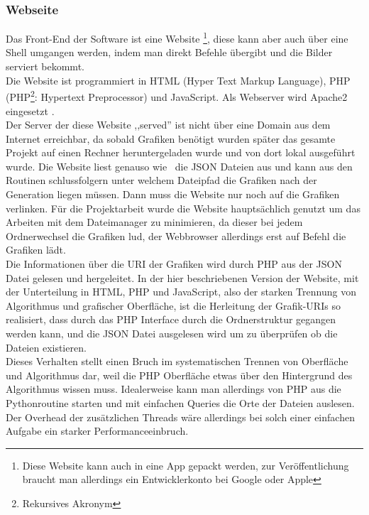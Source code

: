 \subsubsection*{Webseite}
Das Front-End der Software ist eine Website
\footnote{Diese Website kann auch in eine App gepackt werden,
zur Veröffentlichung braucht man allerdings ein Entwicklerkonto bei Google oder Apple},
diese kann aber auch über eine Shell umgangen werden, indem man \vs direkt Befehle
übergibt und die Bilder serviert bekommt.\\
Die Website ist programmiert in HTML (Hyper Text Markup Language),
PHP (PHP\footnote{Rekursives Akronym}: Hypertext Preprocessor) und JavaScript.
Als Webserver wird Apache2 eingesetzt \cite{php} \cite{apache}. \\
Der Server der diese Website ,,served'' ist nicht über eine Domain aus dem Internet
erreichbar, da sobald Grafiken benötigt wurden später das gesamte Projekt auf
einen Rechner heruntergeladen wurde und von dort lokal ausgeführt wurde.
Die Website liest genauso wie \vs\ die JSON Dateien aus und kann aus den
Routinen schlussfolgern unter welchem Dateipfad die Grafiken nach der Generation
liegen müssen. Dann muss die Website nur noch auf die Grafiken verlinken.
Für die Projektarbeit wurde die Website hauptsächlich genutzt um das Arbeiten mit
dem Dateimanager zu minimieren, da dieser bei jedem Ordnerwechsel die Grafiken lud,
der Webbrowser allerdings erst auf Befehl die Grafiken lädt.\\
Die Informationen über die URI der Grafiken wird durch PHP aus der JSON Datei gelesen
und hergeleitet. In der hier beschriebenen Version der Website, mit der Unterteilung
in HTML, PHP und JavaScript, also der starken Trennung von Algorithmus und grafischer
Oberfläche, ist die Herleitung der Grafik-URIs so realisiert, dass durch das PHP
Interface durch die Ordnerstruktur gegangen werden kann, und die JSON Datei ausgelesen
wird um zu überprüfen ob die Dateien existieren.\\
Dieses Verhalten stellt einen Bruch im systematischen Trennen von Oberfläche und Algorithmus
dar, weil die PHP Oberfläche etwas über den Hintergrund des Algorithmus wissen muss.
Idealerweise kann man allerdings von PHP aus die Pythonroutine starten und mit einfachen
Queries die Orte der Dateien auslesen. Der Overhead der zusätzlichen Threads wäre allerdings
bei solch einer einfachen Aufgabe ein starker Performanceeinbruch.\\


